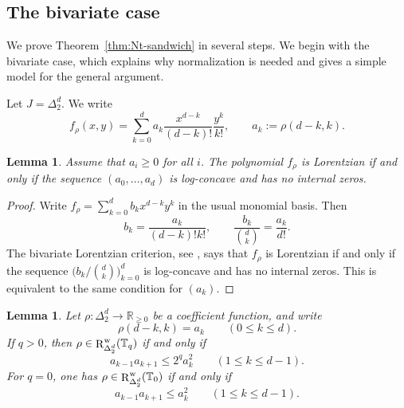 \documentclass[12pt]{amsart}
\newtheorem{lemma}[theorem]{Lemma}
\theoremstyle{definition}
\newcommand{\1}{\mathbf{1}}
\DeclareMathOperator{\upR}{R}   %
\newcommand\R{{\mathbb R}}
\newcommand\T{{\mathbb T}}
\renewcommand\geq{\geqslant}
\newcommand\mb{\texorpdfstring{\textbf{Matt:} }{Matt: }}
\newcommand{\mk}[2][]{\todo[color=orange, #1]{\textbf{Mario}: #2}}
\newcommand\ol{\texorpdfstring{\textbf{Oliver:} }{Oliver: }}
\begin{document}
\subsection{The bivariate case}
We prove Theorem~\ref{thm:Nt-sandwich} in several steps.  We begin with the bivariate case, which explains
why normalization is needed and gives a simple model for the general argument.

Let $J=\Delta_2^d$.  We write
\[
f_\rho(x,y)
=
\sum_{k=0}^d a_k
\frac{x^{d-k}}{(d-k)!}\frac{y^k}{k!},
\qquad a_k:=\rho(d-k,k).
\]

\begin{lemma}
\label{lem:bivariate-lorentzian}
Assume that $a_i \geq 0$ for all $i$. The polynomial $f_\rho$ is Lorentzian if and only if the sequence
$(a_0,\ldots,a_d)$ is log-concave and has no internal zeros.
\end{lemma}

\begin{proof}
Write $f_\rho=\sum_{k=0}^d b_kx^{d-k}y^k$ in the usual monomial basis.  Then
\[
b_k=\frac{a_k}{(d-k)!k!},
\qquad
\frac{b_k}{\binom{d}{k}}=\frac{a_k}{d!}.
\]
The bivariate Lorentzian criterion, see \cite[Example 2.26]{Branden-Huh20}, says that $f_\rho$ is Lorentzian if and only
if the sequence $\bigl(b_k/\binom{d}{k}\bigr)_{k=0}^d$ is log-concave and has no
internal zeros.  This is equivalent to the same condition for $(a_k)$.
\end{proof}


\begin{lemma}
\label{lem:bivariate-Tq-ineq}
Let $\rho:\Delta_2^d\to \R_{\ge 0}$ be a coefficient function, and write
\[
        \rho(d-k,k)=a_k
        \qquad(0\le k\le d).
\]
If $q>0$, then $\rho\in \upR_{\Delta_2^d}^{\rm w}(\T_q)$ if and only if
\[
        a_{k-1}a_{k+1}\le 2^q a_k^2
        \qquad (1\le k\le d-1).
\]
For $q=0$, one has $\rho\in \upR_{\Delta_2^d}^{\rm w}(\T_0)$ if and only if
\[
        a_{k-1}a_{k+1}\le a_k^2
        \qquad (1\le k\le d-1).
\]
\end{lemma}

\end{document}
